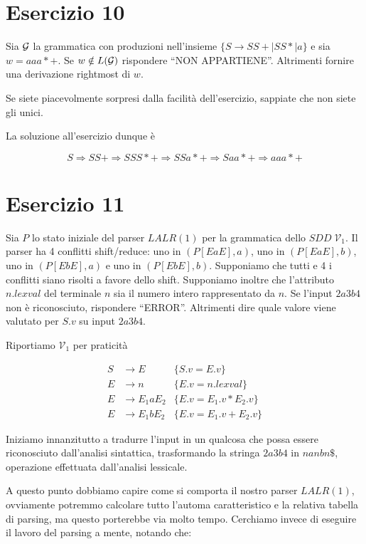 \documentclass[class=book, crop=false, oneside, 12pt]{standalone}
\begin{document}
\section*{Esercizio 10}

Sia \(\mathcal{G}\) la grammatica con produzioni nell'insieme \(\{S \to SS+ \mid SS* \mid a\}\) e sia \(w=aaa*+\).  Se \(w \notin L(\mathcal{G})\) rispondere “NON APPARTIENE”. Altrimenti fornire una derivazione rightmost di \(w\).

Se siete piacevolmente sorpresi dalla facilità dell'esercizio, sappiate che non siete gli unici. 

La soluzione all'esercizio dunque è

\begin{equation}
    S \Rightarrow SS+ \Rightarrow S SS* + \Rightarrow  SSa*+ \Rightarrow  Saa*+ \Rightarrow  aaa*+
\end{equation}

\section*{Esercizio 11}

Sia \(P\) lo  stato  iniziale  del  parser  \(LALR(1)\)  per  la  grammatica  dello  \(SDD \; \mathcal{V}_1\). Il parser ha 4  conflitti shift/reduce:  uno in \((P[EaE],a)\), uno in \((P[EaE],b)\), uno in \((P[EbE],a)\) e uno in \((P[EbE],b)\).  Supponiamo  che  tutti  e  4  i  conflitti  siano  risolti  a  favore  dello  shift.   Supponiamo  inoltre  che  l’attributo \(n.lexval\) del terminale \(n\) sia il numero intero rappresentato da \(n\).  Se l'input \(2a3b4\) non è riconosciuto, rispondere “ERROR”. Altrimenti dire quale valore viene valutato per \(S.v\) su input \(2a3b4\).

Riportiamo \(\mathcal{V}_1\) per praticità

\begin{align*}
    S &\to E &\{S.v = E.v\} \\
    E &\to n &\{E.v = n.lexval\} \\
    E &\to E_1 a E_2 &\{E.v = E_1.v * E_2.v\} \\
    E &\to E_1 b E_2 &\{E.v = E_1.v + E_2.v\} 
\end{align*}

Iniziamo innanzitutto a tradurre l'input in un qualcosa che possa essere riconosciuto dall'analisi sintattica, trasformando la stringa \(2a3b4\) in \(nanbn\$\), operazione effettuata dall'analisi lessicale.

A questo punto dobbiamo capire come si comporta il nostro parser \(LALR(1)\), ovviamente potremmo calcolare tutto l'automa caratteristico e la relativa tabella di parsing, ma questo porterebbe via molto tempo. Cerchiamo invece di eseguire il lavoro del parsing a mente, notando che:
\end{document}
